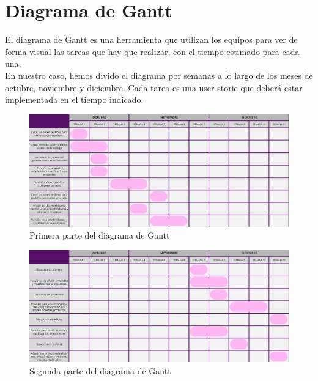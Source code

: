 \chapter{Diagrama de Gantt}

El diagrama de Gantt es una herramienta que utilizan los equipos para ver de forma visual las tareas que hay que realizar, con el tiempo estimado para cada una.\\

En nuestro caso, hemos divido el diagrama por semanas a lo largo de los meses de octubre, noviembre y diciembre. Cada tarea es una user storie que deberá estar implementada en el tiempo indicado.

\begin{figure}[h]
    \centering
    \includegraphics[width=1\textwidth]{figures/gantt-1.png}
    \caption{Primera parte del diagrama de Gantt}
    \label{fig:gantt1}
\end{figure}

\begin{figure}[h]
    \centering
    \includegraphics[width=1\textwidth]{figures/gantt-2.png}
    \caption{Segunda parte del diagrama de Gantt}
    \label{fig:gantt2}
\end{figure}
